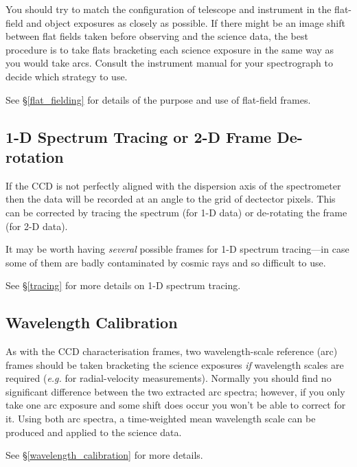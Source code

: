 \documentclass[twoside,11pt]{article}
\newcommand{\htmlref}[2]{#1}
\newcommand{\scspec}[2]{#1}
\newcommand{\scspec}[2]{#2}
\begin{document}
You should try to match the configuration of telescope and instrument
in the flat-field and object exposures as closely as possible.
If there might be an image shift between flat fields taken before
observing and the science data, the best procedure is to take flats
\htmlref{bracketing}{gl_bracket} each science exposure in the same
way as you would take arcs.  Consult the instrument manual for your
\htmlref{spectrograph}{gl_spectrograph} to decide which strategy
to use.

See \scspec{\S\ref{flat_fielding}}
{\htmlref{Flat Fielding}{flat_fielding}} for details of
the purpose and use of flat-field frames.


\subsection{1-D Spectrum Tracing or 2-D Frame De-rotation}

If the CCD is not perfectly aligned with the dispersion axis of the
spectrometer then the data will be recorded at an angle to the grid of
dectector pixels. This can be corrected by tracing the spectrum (for
1-D data) or de-rotating the frame (for 2-D data).

It may be worth having {\em several} possible frames for
1-D spectrum tracing\scspec{---}{ - }in case some of them are badly
contaminated by cosmic rays and so difficult to use.

See \scspec{\S\ref{tracing}}{\htmlref{Tracing}{tracing}}
for more details on 1-D spectrum tracing.


\subsection{Wavelength Calibration}

As with the \htmlref{CCD}{gl_ccd} characterisation frames, two
wavelength-scale reference (\htmlref{arc}{gl_arc}) frames should be
taken \htmlref{bracketing}{gl_bracketing} the science exposures
{\em if} \htmlref{wavelength scales}{gl_wavelength} are required
({\it{e.g.}} for radial-velocity measurements)\@.
Normally you should find no significant difference between the two
extracted arc spectra; however, if you only take one arc exposure and
some shift does occur you won't be able to correct for it.
Using both arc spectra, a time-weighted mean wavelength scale can be
produced and applied to the science data.

See \scspec{\S\ref{wavelength_calibration}}
{\htmlref{Wavelength Calibration}{wavelength_calibration}}
for more details.
\end{document}
